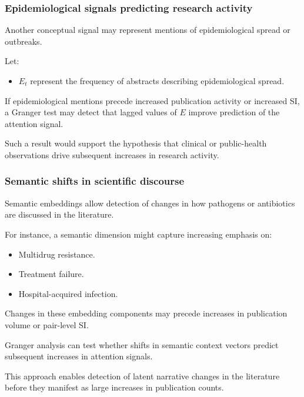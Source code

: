 \documentclass[
]{article}
\providecommand{\tightlist}{%
  \setlength{\itemsep}{0pt}\setlength{\parskip}{0pt}}
\begin{document}
\subsubsection{Epidemiological signals predicting
research
activity}\label{54-example-2-epidemiological-signals-predicting-research-activity}

Another conceptual signal may represent mentions of epidemiological
spread or outbreaks.

Let:

\begin{itemize}
\tightlist
\item
  \(E_t\) represent the frequency of abstracts describing
  epidemiological spread.
\end{itemize}

If epidemiological mentions precede increased publication activity or
increased SI, a Granger test may detect that lagged values of \(E\)
improve prediction of the attention signal.

Such a result would support the hypothesis that clinical or
public-health observations drive subsequent increases in research
activity.

\subsubsection{Semantic shifts in scientific
discourse}\label{55-example-3-semantic-shifts-in-scientific-discourse}

Semantic embeddings allow detection of changes in how pathogens or
antibiotics are discussed in the literature.

For instance, a semantic dimension might capture increasing emphasis on:

\begin{itemize}
\tightlist
\item
  Multidrug resistance.
\item
  Treatment failure.
\item
  Hospital-acquired infection.
\end{itemize}

Changes in these embedding components may precede increases in
publication volume or pair-level SI.

Granger analysis can test whether shifts in semantic context vectors
predict subsequent increases in attention signals.

This approach enables detection of latent narrative changes in the
literature before they manifest as large increases in publication
counts.
\end{document}
